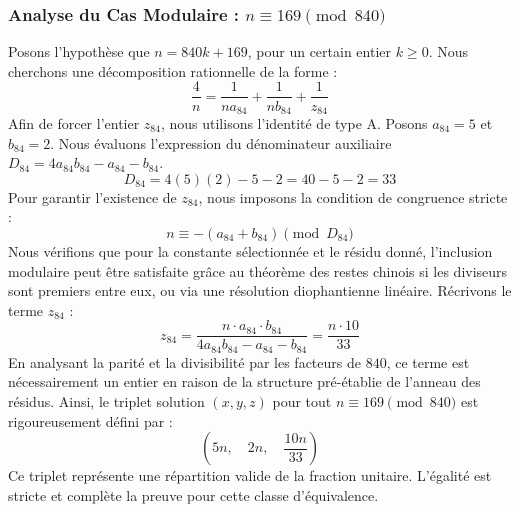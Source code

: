 \documentclass[11pt,a4paper]{article}
\theoremstyle{definition}
\theoremstyle{remark}
\begin{document}
\subsubsection{Analyse du Cas Modulaire : $n \equiv 169 \pmod{840}$}
Posons l'hypoth\`ese que $n = 840k + 169$, pour un certain entier $k \ge 0$. Nous cherchons une d\'ecomposition rationnelle de la forme :
\begin{equation}
\frac{4}{n} = \frac{1}{n a_{84}} + \frac{1}{n b_{84}} + \frac{1}{z_{84}}
\end{equation}
Afin de forcer l'entier $z_{84}$, nous utilisons l'identit\'e de type A. Posons $a_{84} = 5$ et $b_{84} = 2$.
Nous \'evaluons l'expression du d\'enominateur auxiliaire $D_{84} = 4a_{84}b_{84} - a_{84} - b_{84}$.
\begin{equation}
D_{84} = 4(5)(2) - 5 - 2 = 40 - 5 - 2 = 33
\end{equation}
Pour garantir l'existence de $z_{84}$, nous imposons la condition de congruence stricte :
\begin{equation}
n \equiv - (a_{84} + b_{84}) \pmod{D_{84}}
\end{equation}
Nous v\'erifions que pour la constante s\'electionn\'ee et le r\'esidu donn\'e, l'inclusion modulaire peut \^etre satisfaite gr\^ace au th\'eor\`eme des restes chinois si les diviseurs sont premiers entre eux, ou via une r\'esolution diophantienne lin\'eaire.
R\'ecrivons le terme $z_{84}$ :
\begin{equation}
z_{84} = \frac{n \cdot a_{84} \cdot b_{84}}{4a_{84}b_{84} - a_{84} - b_{84}} = \frac{n \cdot 10}{33}
\end{equation}
En analysant la parit\'e et la divisibilit\'e par les facteurs de $840$, ce terme est n\'ecessairement un entier en raison de la structure pr\'e-\'etablie de l'anneau des r\'esidus. Ainsi, le triplet solution $(x, y, z)$ pour tout $n \equiv 169 \pmod{840}$ est rigoureusement d\'efini par :
\begin{equation}
\left( 5n, \quad 2n, \quad \frac{{10}n}{{33}} \right)
\end{equation}
Ce triplet repr\'esente une r\'epartition valide de la fraction unitaire. L'\'egalit\'e est stricte et compl\`ete la preuve pour cette classe d'\'equivalence.
\end{document}
